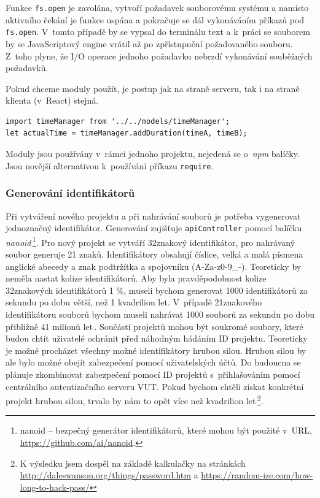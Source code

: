 Funkce \texttt{fs.open} je zavolána, vytvoří požadavek souborovému systému a namísto aktivního čekání je funkce uspána a pokračuje se dál vykonáváním příkazů pod \texttt{fs.open}. V~tomto případě by se vypsal do terminálu text  a k~práci se souborem by se JavaScriptový engine vrátil až po zpřístupnění požadovaného souboru. Z~toho plyne, že I/O operace jednoho požadavku nebrzdí vykonávání souběžných požadavků.

Pokud chceme moduly použít, je postup jak na straně serveru, tak i na straně klienta (v~React) stejná.
\begin{lstlisting}[style=JavaScript]
import timeManager from '../../models/timeManager';
let actualTime = timeManager.addDuration(timeA, timeB);
\end{lstlisting}

Moduly jsou používány v~rámci jednoho projektu, nejedená se o~\textit{npm} balíčky. Jsou novější alternativou k~používání příkazu \texttt{require}.

\subsubsection{Generování identifikátorů}
Při vytváření nového projektu a při nahrávání souborů je potřeba vygenerovat jednoznačný identifikátor. Generování zajišťuje \texttt{apiController} pomocí balíčku \textit{nanoid}\,\footnote{nanoid -- bezpečný generátor identifikátorů, které mohou být použité v~URL, \url{https://github.com/ai/nanoid}.}. Pro nový projekt se vytváří 32znakový identifikátor, pro nahrávaný soubor generuje 21 znaků. Identifikátory obsahují číslice, velká a malá písmena anglické abecedy a znak podtržítka a spojovníku (A-Za-z0-9\_-). Teoreticky by neměla nastat kolize identifikátorů. Aby byla pravděpodobnost kolize 32znakových identifikátorů 1 \%, museli bychom generovat 1000 identifikátorů za sekundu po dobu větší, než 1 kvadrilion let. V~případě 21znakového identifikátoru souborů bychom museli nahrávat 1000 souborů za sekundu po dobu přibližně 41 milionů let\,\cite{collision}. Součástí projektů mohou být soukromé soubory, které budou chtít uživatelé ochránit před náhodným hádáním ID projektu. Teoreticky je možné procházet všechny možné identifikátory hrubou silou. Hrubou silou by ale bylo možné obejít zabezpečení pomocí uživatelských účtů. Do budoucna se plánuje zkombinovat zabezpečení pomocí ID projektů s~přihlašováním pomocí centrálního autentizačního serveru VUT. Pokud bychom chtěli získat konkrétní projekt hrubou silou, trvalo by nám to opět více než kvadrilion let\,\footnote{K výsledku jsem dospěl na základě kalkulačky na stránkách \url{http://daleswanson.org/things/password.htm} a \url{https://random-ize.com/how-long-to-hack-pass/}}. 

